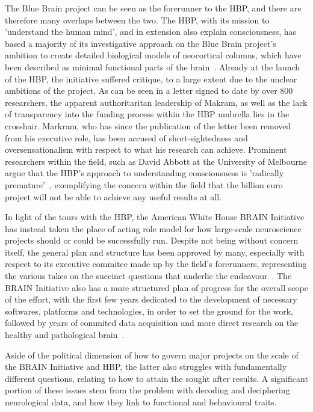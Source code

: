 \documentclass[10pt]{article}\usepackage[]{graphicx}\usepackage[]{color}
\theoremstyle{plain}
\begin{document}
\begin{multicols*}{2}
The Blue Brain project can be seen as the forerunner to the HBP, and there are therefore many overlaps between the two. The HBP, with its mission to 'understand the human mind', and in extension also explain consciousness, has based a majority of its investigative approach on the Blue Brain project's ambition to create detailed biological models of neocortical columns, which have been described as minimal functional parts of the brain~\cite{rakic2008confusing}. 
	Already at the launch of the HBP, the initiative suffered critique, to a large extent due to the unclear ambitions of the project. As can be seen in a letter signed to date by over 800 researchers, the apparent authoritaritan leadership of Makram, as well as the lack of transparency into the funding process within the HBP umbrella lies in the crosshair. Markram, who has since the publication of the letter been removed from his executive role, has been accused of short-sightedness and oversensationalism with respect to what his research can achieve. Prominent researchers within the field, such as David Abbott at the University of Melbourne argue that the HBP's approach to understanding consciousness is 'radically premature'~\cite{sample2014scientists}, exemplifying the concern within the field that the billion euro project will not be able to achieve any useful results at all.
					          
	In light of the tours with the HBP, the American White House BRAIN Initiative has instead taken the place of acting role model for how large-scale neuroscience projects should or could be successfully run. Despite not being without concern itself, the general plan and structure has been approved by many, especially with respect to its executive commitee made up by the field's forerunners, representing the various takes on the succinct questions that underlie the endeavour~\cite{smith_2017}. The BRAIN Initiative also has a more structured plan of progress for the overall scope of the effort, with the first few years dedicated to the development of necessary softwares, platforms and technologies, in order to set the ground for the work, followed by years of commited data acquisition and more direct research on the healthy and pathological brain~\cite{nih_brain_initiative_2017}.
	
	Aside of the political dimension of how to govern major projects on the scale of the BRAIN Initiative and HBP, the latter also struggles with fundamentally different questions, relating to how to attain the sought after results. A significant portion of these issues stem from the problem with decoding and deciphering neurological data, and how they link to functional and behavioural traits.
	

\end{multicols*}
\end{document}
